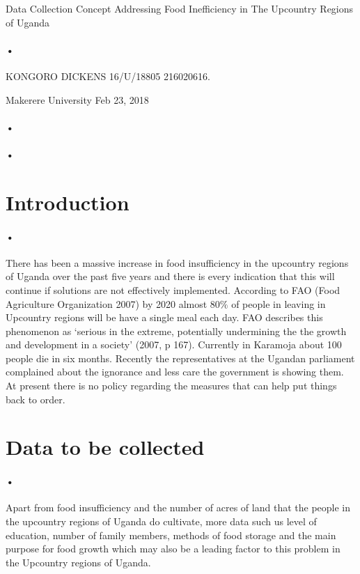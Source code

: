 \documentclass[12pt]{article}
\begin{document}
\begin{titlepage}
\centerline{Data Collection Concept Addressing Food Inefficiency in The Upcountry Regions of Uganda\\}
\paragraph*{•}
\centerline{ KONGORO DICKENS 16/U/18805 216020616.\\}
\centerline{ Makerere University Feb 23, 2018\\}
\paragraph*{•}
\paragraph*{•}
\end{titlepage}
\newpage
\section{Introduction}
\paragraph{•}There has been a massive increase in food insufficiency in the upcountry regions of Uganda over the past five years and there is every indication that this will continue if solutions are not effectively implemented. According to FAO (Food Agriculture Organization 2007) by 2020 almost 80$\%$ of people in leaving in Upcountry  regions will be have a single meal each day. FAO describes this phenomenon as ‘serious in the extreme, potentially undermining the the growth and development in a society’ (2007, p 167). Currently in Karamoja about 100 people die in six months.
Recently the representatives at the Ugandan parliament  complained about the ignorance and less care the government is showing them.  At present there is no policy regarding the measures that can help put things back to order.
\section{Data to be collected}
\paragraph{•}Apart from food insufficiency and the number of acres of land that the people in the upcountry regions of Uganda do cultivate, more data such us level of education, number of family members, methods of food storage and the main purpose for food growth which may also be a leading factor to this problem in the Upcountry regions of Uganda.
\end{document}
